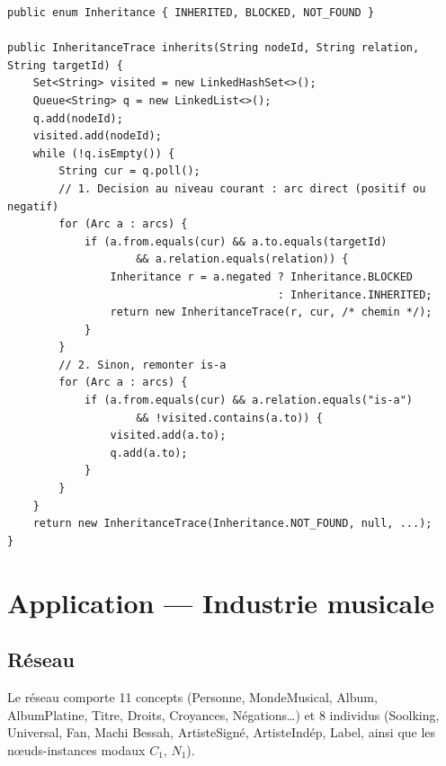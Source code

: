 \begin{lstlisting}[caption={Moteur d'héritage avec exceptions (extrait)}]
public enum Inheritance { INHERITED, BLOCKED, NOT_FOUND }

public InheritanceTrace inherits(String nodeId, String relation, String targetId) {
    Set<String> visited = new LinkedHashSet<>();
    Queue<String> q = new LinkedList<>();
    q.add(nodeId);
    visited.add(nodeId);
    while (!q.isEmpty()) {
        String cur = q.poll();
        // 1. Decision au niveau courant : arc direct (positif ou negatif)
        for (Arc a : arcs) {
            if (a.from.equals(cur) && a.to.equals(targetId)
                    && a.relation.equals(relation)) {
                Inheritance r = a.negated ? Inheritance.BLOCKED
                                          : Inheritance.INHERITED;
                return new InheritanceTrace(r, cur, /* chemin */);
            }
        }
        // 2. Sinon, remonter is-a
        for (Arc a : arcs) {
            if (a.from.equals(cur) && a.relation.equals("is-a")
                    && !visited.contains(a.to)) {
                visited.add(a.to);
                q.add(a.to);
            }
        }
    }
    return new InheritanceTrace(Inheritance.NOT_FOUND, null, ...);
}
\end{lstlisting}

\section{Application — Industrie musicale}

\subsection{Réseau}

Le réseau comporte 11 concepts (Personne, MondeMusical, Album, AlbumPlatine,
Titre, Droits, Croyances, Négations…) et 8 individus
(Soolking, Universal, Fan, Machi Bessah, ArtisteSigné, ArtisteIndép, Label,
ainsi que les nœuds-instances modaux $C_1$, $N_1$).


